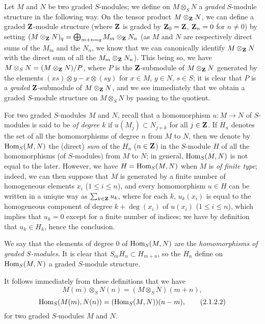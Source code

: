 \begin{env}[2.1.2]
\label{II.2.1.2}
Let $M$ and $N$ be two graded $S$-modules;
we define on $M\otimes_S N$ a \emph{graded} $S$-module structure in the following way.
On the tensor product $M\otimes_\mathbf{Z}N$, we can define a graded $\mathbf{Z}$-module structure (where $\mathbf{Z}$ is graded by $\mathbf{Z}_0=\mathbf{Z}$, $\mathbf{Z}_n=0$ for $n\neq 0$) by setting $(M\otimes_\mathbf{Z}N)_q=\bigoplus_{m+n=q}M_m\otimes_\mathbf{Z}N_n$ (as $M$ and $N$ are respectively direct sums of the $M_m$ and the $N_n$, we know that we can canonically identify $M\otimes_\mathbf{Z}N$ with the direct sum of all the $M_m\otimes_\mathbf{Z}N_n$).
This being so, we have $M\otimes_S N=(M\otimes_\mathbf{Z}N)/P$, where $P$ is the $\mathbf{Z}$-submodule of $M\otimes_\mathbf{Z}N$ generated by the elements $(xs)\otimes y-x\otimes(sy)$ for $x\in M$, $y\in N$, $s\in S$;
it is clear that $P$ is a \emph{graded} $\mathbf{Z}$-submodule of $M\otimes_\mathbf{Z}N$, and we see immediately that we obtain a graded $S$-module structure on $M\otimes_S N$ by passing to the quotient.

For two graded $S$-modules $M$ and $N$, recall that a homomorphism $u:M\to N$ of $S$-modules is said to be \emph{of degree $k$} if $u(M_j)\subset N_{j+k}$ for all $j\in\mathbf{Z}$.
If $H_n$ denotes the set of all the homomorphisms of degree $n$ from $M$ to $N$, then we denote by $\operatorname{Hom}_S(M,N)$ the (direct) \emph{sum} of the $H_n$ ($n\in\mathbf{Z}$) in the $S$-module $H$ of all the homomorphisms (of $S$-modules) from $M$ to $N$;
in general, $\operatorname{Hom}_S(M,N)$ is not equal to the later.
However, we have $H=\operatorname{Hom}_S(M,N)$ when $M$ is \emph{of finite type};
indeed, we can then suppose that $M$ is generated by a finite number of homogeneous elements $x_i$ ($1\leq i\leq n$), and every homomorphism $u\in H$ can be written in a unique way as $\sum_{k\in\mathbf{Z}}u_k$, where for each $k$, $u_k(x_i)$ is equal to the homogeneous component of degree $k+\deg(x_i)$ of $u(x_i)$ ($1\leq i\leq n$), which implies that $u_k=0$ except for a finite number of indices;
we have by definition that $u_k\in H_k$, hence the conclusion.

We say that the elements of degree $0$ of $\operatorname{Hom}_S(M,N)$ are the \emph{homomorphisms of graded $S$-modules}.
It is clear that $S_m H_n\subset H_{m+n}$, so the $H_n$ define on $\operatorname{Hom}_S(M,N)$ a graded $S$-module structure.

It follows immediately from these definitions that we have
\[
\label{II.2.1.2.1}
  M(m)\otimes_S N(n)=(M\otimes_S N)(m+n),
\tag{2.1.2.1}
\]
\[
\label{II.2.1.2.2}
  \operatorname{Hom}_S(M(m),N(n))=(\operatorname{Hom}_S(M,N))(n-m),
\tag{2.1.2.2}
\]
for two graded $S$-modules $M$ and $N$.


\end{env}
